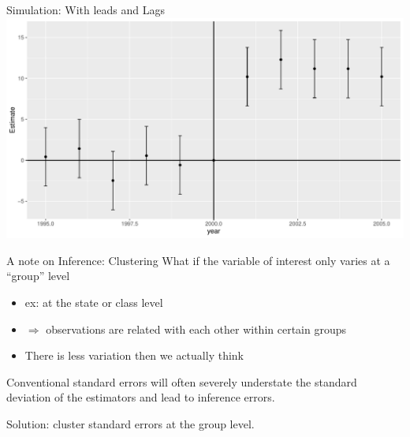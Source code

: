 \documentclass[
  ignorenonframetext,
]{beamer}
\begin{document}
\begin{frame}{Simulation: With leads and Lags}
\protect\hypertarget{simulation-with-leads-and-lags-7}{}
\includegraphics{"Slides_DID_files/figure-beamer/didplotb-1.pdf"}
\end{frame}

\begin{frame}{A note on Inference: Clustering}
\protect\hypertarget{a-note-on-inference-clustering}{}
What if the variable of interest only varies at a ``group'' level

\begin{itemize}
\item
  ex: at the state or class level
\item
  \(\Rightarrow\) observations are related with each other within
  certain groups
\item
  There is less variation then we actually think
\end{itemize}

Conventional standard errors will often severely understate the standard
deviation of the estimators and lead to inference errors.

Solution: cluster standard errors at the group level.
\end{frame}
\end{document}
